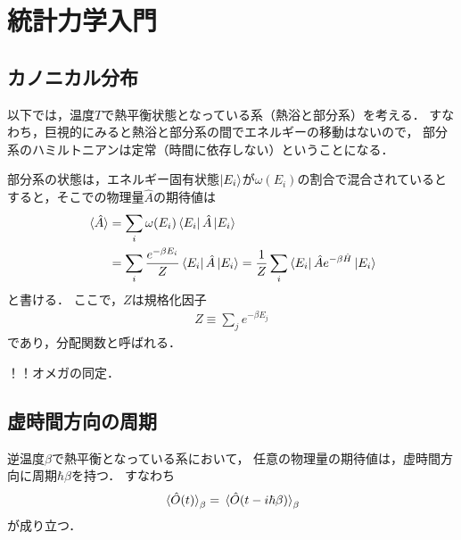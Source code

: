 \documentclass[uplatex,dvipdfmx]{vkaishi}
\begin{document}
\section{統計力学入門}

\subsection{カノニカル分布}

以下では，温度$T$で熱平衡状態となっている系（熱浴と部分系）を考える．
すなわち，巨視的にみると熱浴と部分系の間でエネルギーの移動はないので，
部分系のハミルトニアンは定常（時間に依存しない）ということになる．

部分系の状態は，エネルギー固有状態$\ket{E_i}$が$\omega(E_i)$の割合で混合されているとすると，そこでの物理量$\hat A$の期待値は
\begin{align}
  \expval*{\hat A}
  &= \sum_i \omega(E_i) \bra{E_i} \hat A \ket{E_i} \\
  &= \sum_i \frac{e^{-\beta E_i}}{Z} \bra{E_i} \hat A \ket{E_i}
  = \frac1Z \sum_i \bra{E_i} \hat A e^{-\beta \hat H} \ket{E_i}
\end{align}
と書ける．
ここで，$Z$は規格化因子
\begin{align}
  Z \equiv \sum_j e^{-\beta E_j}
\end{align}
であり，分配関数と呼ばれる．

！！オメガの同定．

\subsection{虚時間方向の周期}

逆温度$\beta$で熱平衡となっている系において，
任意の物理量の期待値は，虚時間方向に周期$\hbar\beta$を持つ．
すなわち
\begin{align}
  \expval*{\hat O(t)}_\beta
  = \expval*{\hat O(t - i\hbar\beta)}_\beta
  \label{eq:O-period}
\end{align}
が成り立つ．
\end{document}
